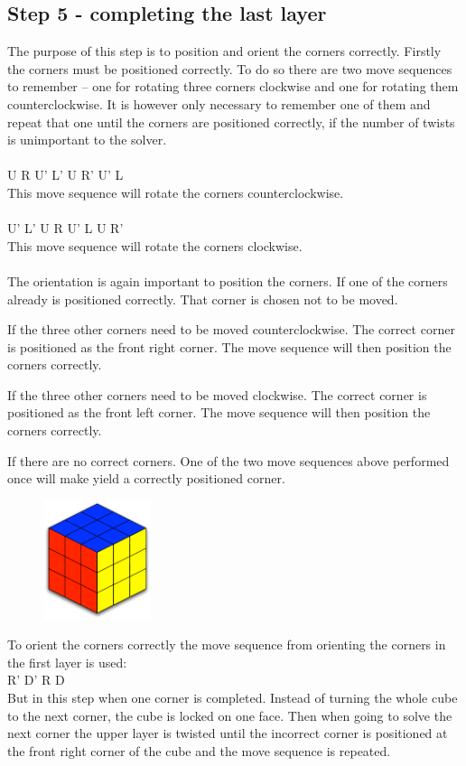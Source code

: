 \subsection{Step 5 - completing the last layer}
The purpose of this step is to position and orient the corners correctly. Firstly the corners must be positioned correctly. To do so there are two move sequences to remember -- one for rotating three corners clockwise and one for rotating them counterclockwise. It is however only necessary to remember one of them and repeat that one until the corners are positioned correctly, if the number of twists is unimportant to the solver. \\
\\
U R U' L' U R' U' L
\\
This move sequence will rotate the corners counterclockwise.
\\
\\
U' L' U R U' L U R'
\\
This move sequence will rotate the corners clockwise.
\\
\\
The orientation is again important to position the corners. If one of the corners already is positioned correctly. That corner is chosen not to be moved. 

If the three other corners need to be moved counterclockwise. The correct corner is positioned as the front right corner. The move sequence will then position the corners correctly.

If the three other corners need to be moved clockwise. The correct corner is positioned as the front left corner. The move sequence will then position the corners correctly.

If there are no correct corners. One of the two move sequences above performed once will make yield a correctly positioned corner.

\begin{figure}
\begin{center}
	\includegraphics[width=0.28\textwidth]{input/pics/8done}	
\end{center}
\caption{}
\label{fig:8done}
\end{figure}

To orient the corners correctly the move sequence from orienting the corners in the first layer is used: \\

R' D' R D \\

But in this step when one corner is completed. Instead of turning the whole cube to the next corner, the cube is locked on one face. Then when going to solve the next corner the upper layer is twisted until the incorrect corner is positioned at the front right corner of the cube and the move sequence is repeated.